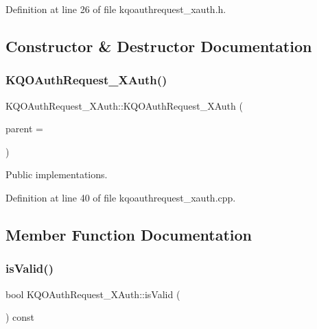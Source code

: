 Definition at line 26 of file kqoauthrequest\+\_\+xauth.\+h.



\subsection{Constructor \& Destructor Documentation}
\mbox{\label{class_k_q_o_auth_request___x_auth_a5b96dc9b8845f7830c9108080034b440}} 
\subsubsection{\texorpdfstring{K\+Q\+O\+Auth\+Request\+\_\+\+X\+Auth()}{KQOAuthRequest\_XAuth()}}
{\footnotesize\ttfamily K\+Q\+O\+Auth\+Request\+\_\+\+X\+Auth\+::\+K\+Q\+O\+Auth\+Request\+\_\+\+X\+Auth (\begin{DoxyParamCaption}\item[{Q\+Object $\ast$}]{parent = {} }\end{DoxyParamCaption})}

Public implementations. 

Definition at line 40 of file kqoauthrequest\+\_\+xauth.\+cpp.



\subsection{Member Function Documentation}
\mbox{\label{class_k_q_o_auth_request___x_auth_a16c33c7beb070b6af0e8b126330b239e}} 
\subsubsection{\texorpdfstring{is\+Valid()}{isValid()}}
{\footnotesize\ttfamily bool K\+Q\+O\+Auth\+Request\+\_\+\+X\+Auth\+::is\+Valid (\begin{DoxyParamCaption}{ }\end{DoxyParamCaption}) const\hspace{0.3cm}{\ttfamily [virtual]}}


